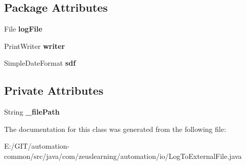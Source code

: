 \subsection*{Package Attributes}
\begin{DoxyCompactItemize}
\item 
\hypertarget{classcom_1_1zeuslearning_1_1automation_1_1io_1_1LogToExternalFile_ac0dbd2bf1b6dd92423dd6ff9fe50f04a}{}\label{classcom_1_1zeuslearning_1_1automation_1_1io_1_1LogToExternalFile_ac0dbd2bf1b6dd92423dd6ff9fe50f04a} 
File {\bfseries log\+File}
\item 
\hypertarget{classcom_1_1zeuslearning_1_1automation_1_1io_1_1LogToExternalFile_a4422f288cb31cf3adf0774f225c0989c}{}\label{classcom_1_1zeuslearning_1_1automation_1_1io_1_1LogToExternalFile_a4422f288cb31cf3adf0774f225c0989c} 
Print\+Writer {\bfseries writer}
\item 
\hypertarget{classcom_1_1zeuslearning_1_1automation_1_1io_1_1LogToExternalFile_aec51e37560cfa2e32b228bc2287f487c}{}\label{classcom_1_1zeuslearning_1_1automation_1_1io_1_1LogToExternalFile_aec51e37560cfa2e32b228bc2287f487c} 
Simple\+Date\+Format {\bfseries sdf}
\end{DoxyCompactItemize}
\subsection*{Private Attributes}
\begin{DoxyCompactItemize}
\item 
\hypertarget{classcom_1_1zeuslearning_1_1automation_1_1io_1_1LogToExternalFile_af2e881ae0c94553da9edfc1b71e6cf07}{}\label{classcom_1_1zeuslearning_1_1automation_1_1io_1_1LogToExternalFile_af2e881ae0c94553da9edfc1b71e6cf07} 
String {\bfseries \+\_\+file\+Path}
\end{DoxyCompactItemize}


The documentation for this class was generated from the following file\+:\begin{DoxyCompactItemize}
\item 
E\+:/\+G\+I\+T/automation-\/common/src/java/com/zeuslearning/automation/io/Log\+To\+External\+File.\+java\end{DoxyCompactItemize}
